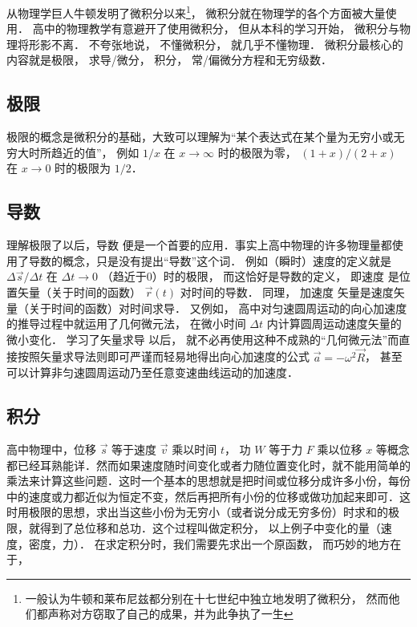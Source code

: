 
从物理学巨人牛顿发明了微积分以来\footnote{一般认为牛顿和莱布尼兹都分别在十七世纪中独立地发明了微积分， 然而他们都声称对方窃取了自己的成果，并为此争执了一生}， 微积分就在物理学的各个方面被大量使用． 高中的物理教学有意避开了使用微积分， 但从本科的学习开始， 微积分与物理将形影不离． 不夸张地说， 不懂微积分， 就几乎不懂物理． 微积分最核心的内容就是极限， 求导/微分， 积分， 常/偏微分方程和无穷级数．

\subsection{极限}
极限的概念是微积分的基础，大致可以理解为“某个表达式在某个量为无穷小或无穷大时所趋近的值”， 例如 $1/x$ 在 $x\to\infty$ 时的极限为零， $(1+x)/(2+x)$ 在 $x\to 0$ 时的极限为 $1/2$． 

\subsection{导数}
理解极限了以后，导数 便是一个首要的应用．事实上高中物理的许多物理量都使用了导数的概念，只是没有提出“导数”这个词． 例如（瞬时）速度的定义就是 $\Delta\vec s/\Delta t$ 在 $\Delta t \to 0$ （趋近于0）时的极限， 而这恰好是导数的定义， 即速度%
是位置矢量（关于时间的函数） $\vec r(t)$ 对时间的导数． 同理， 加速度%
矢量是速度矢量（关于时间的函数）对时间求导． 又例如， 高中对匀速圆周运动的向心加速度的推导过程中就运用了几何微元法， 在微小时间 $\Delta t$ 内计算圆周运动速度矢量的微小变化． 学习了矢量求导 以后， 就不必再使用这种不成熟的“几何微元法”而直接按照矢量求导法则即可严谨而轻易地得出向心加速度的公式 $\vec a = -\omega^2 \vec R$， 甚至可以计算非匀速圆周运动乃至任意变速曲线运动的加速度．

\subsection{积分}
高中物理中，位移 $\vec s$ 等于速度 $\vec v$ 乘以时间 $t$， 功 $W$ 等于力 $F$ 乘以位移 $x$ 等概念都已经耳熟能详．然而如果速度随时间变化或者力随位置变化时，就不能用简单的乘法来计算这些问题．这时一个基本的思想就是把时间或位移分成许多小份，每份中的速度或力都近似为恒定不变，然后再把所有小份的位移或做功加起来即可．这时用极限的思想，求出当这些小份为无穷小（或者说分成无穷多份）时求和的极限，就得到了总位移和总功．这个过程叫做定积分， 以上例子中变化的量（速度，密度，力）． 在求定积分时，我们需要先求出一个原函数， 而巧妙的地方在于，

